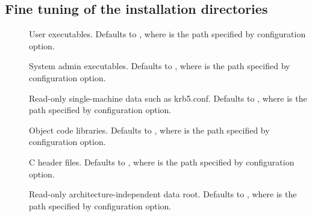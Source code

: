 \documentclass[letterpaper,10pt,english]{sphinxmanual}
\begin{document}
\subsection{Fine tuning of the installation directories}
\label{\detokenize{build/options2configure:fine-tuning-of-the-installation-directories}}\begin{description}
\item[{\sphinxstylestrong{-}}] \leavevmode
User executables.  Defaults to , where
 is the path specified by \sphinxstylestrong{-}
configuration option.

\item[{\sphinxstylestrong{-}}] \leavevmode
System admin executables.  Defaults to , where
 is the path specified by \sphinxstylestrong{-}
configuration option.

\item[{\sphinxstylestrong{-}}] \leavevmode
Read-only single-machine data such as krb5.conf.
Defaults to , where
 is the path specified by \sphinxstylestrong{-} configuration
option.

\item[{\sphinxstylestrong{-}}] \leavevmode
Object code libraries.  Defaults to , where
 is the path specified by \sphinxstylestrong{-}
configuration option.

\item[{\sphinxstylestrong{-}}] \leavevmode
C header files.  Defaults to , where  is
the path specified by \sphinxstylestrong{-} configuration option.

\item[{\sphinxstylestrong{-}}] \leavevmode
Read-only architecture-independent data root.  Defaults to
, where  is the path specified by
\sphinxstylestrong{-} configuration option.


\end{description}
\end{document}
